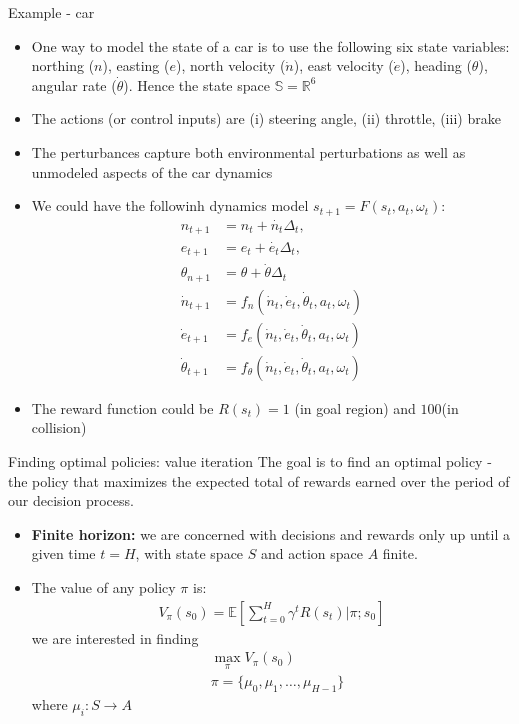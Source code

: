 \documentclass[10pt,mathserif]{beamer}
\begin{document}
\begin{frame}{Example - car}
\begin{itemize}
\item One way to model the state of a car is to use the following six state variables: northing ($n$),
easting ($e$), north velocity ($\dot{n}$), east velocity ($\dot{e}$), heading ($\theta$), angular rate ($\dot{\theta}$). Hence the state space $\mathbb{S}= \mathbb{R}^6$
\item The actions (or control inputs) are (i) steering angle, (ii) throttle, (iii) brake
\item The perturbances capture both environmental perturbations as well as unmodeled aspects of the car dynamics
\item We could have the followinh dynamics model $s_{t+1} = F(s_t, a_t, \omega_t)$:
\begin{align}
n_{t+1} &= n_t + \dot{n_t}\Delta_t,\\
e_{t+1} &= e_t + \dot{e_t}\Delta_t, \\
\theta_{n+1}&=\theta + \dot{\theta}\Delta_t\\
\dot{n}_{t+1} &= f_n(\dot{n}_t,\dot{e}_t,\dot{\theta}_t, a_t, \omega_t)\\ 
\dot{e}_{t+1} &= f_e(\dot{n}_t,\dot{e}_t,\dot{\theta}_t, a_t, \omega_t)\\
\dot{\theta}_{t+1} &= f_{\theta}(\dot{n}_t,\dot{e}_t,\dot{\theta}_t, a_t, \omega_t)
\end{align} 
\item The reward function could be $R(s_t) = 1$ (in goal region) and $100$(in collision)
\end{itemize}
\end{frame}

\begin{frame}{Finding optimal policies: value iteration}
The goal is to find an optimal policy - the policy that maximizes the expected total of rewards 
earned over the period of our decision process.
\begin{itemize}
\item \textbf{Finite horizon:} we are concerned with decisions and rewards only up until a given time $t=H$, with state space $S$ and action space $A$ finite. 
\item The value of any policy $\pi$ is:
\begin{align}
V_{\pi}(s_0) = \mathbb{E}[\sum_{t=0}^H \gamma^tR(s_t)|\pi; s_0]
\end{align}
we are interested in finding
\begin{align}
&\max_{\pi} V_{\pi}(s_0) \\
&\pi = \{\mu_0, \mu_1,\dots, \mu_{H-1}\}
\end{align}
where $\mu_i: S\rightarrow A$
\end{itemize}
\end{frame}
\end{document}
